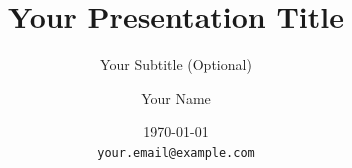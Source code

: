 \documentclass{beamer}
\title{Your Presentation Title}
\subtitle{Your Subtitle (Optional)}
\author{Your Name}
\institute{Your Institution}
\date{\today\\\small\texttt{your.email@example.com}}
\begin{document}
\begin{frame}
  \titlepage
\end{frame}

%   
%   
%   


\end{document}
